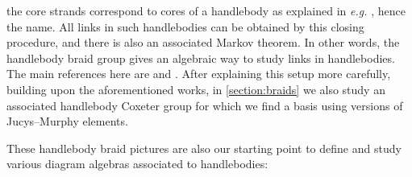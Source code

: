 \documentclass[a4paper,11pt]{amsart}
\newcommand{\eg}{\textsl{e.g.}}
\numberwithin{equation}{section}
\let\fullref\autoref
\begin{document}
the core strands correspond to cores of a 
handlebody as explained in {\eg} 
\cite[Section 2]{RoTu-homflypt-typea}, hence the name. All links in such handlebodies can 
be obtained by this closing procedure, and there is also an associated 
Markov theorem. In other words, the handlebody braid group gives an 
algebraic way to study links in handlebodies. The main references 
here are \cite{Ve-handlebodies} and \cite{HaOlLa-handlebodies}.
After explaining this setup more carefully, building upon the aforementioned 
works, in \fullref{section:braids} 
we also study an associated handlebody Coxeter group for which we find a basis 
using versions of Jucys--Murphy elements.

These handlebody braid pictures are also our starting point to define and study 
various diagram algebras associated to handlebodies:
\end{document}
